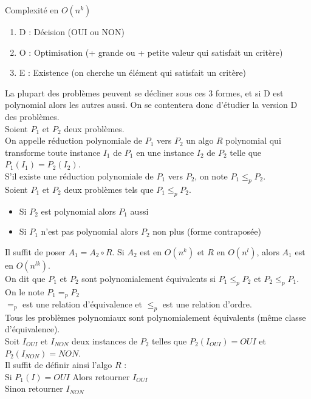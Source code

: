  Complexité en $O(n^k)$

\begin{enumerate}
	\item D : Décision (OUI ou NON)
	\item O : Optimisation (+ grande ou + petite valeur qui satisfait un critère)
	\item E : Existence (on cherche un élément qui satisfait un critère)
\end{enumerate}
La plupart des problèmes peuvent se décliner sous ces 3 formes, et si D est polynomial alors les autres aussi. On se contentera donc d'étudier la version D des problèmes. \\

 Soient $P_1$ et $P_2$ deux problèmes.\\
On appelle réduction polynomiale de $P_1$ vers $P_2$ un algo $R$ polynomial qui transforme toute instance $I_1$ de $P_1$ en une instance $I_2$ de $P_2$ telle que $P_1(I_1) = P_2(I_2)$. \\
S'il existe une réduction polynomiale de $P_1$ vers $P_2$, on note $P_1 \leq_p P_2$. \\

 Soient $P_1$ et $P_2$ deux problèmes tels que $P_1 \leq_p P_2$.
\begin{itemize}
	\item Si $P_2$ est polynomial alors $P_1$ aussi
	\item Si $P_1$ n'est pas polynomial alors $P_2$ non plus (forme contraposée)
\end{itemize}

 Il suffit de poser $A_1 = A_2 \circ R$. Si $A_2$ est en $O(n^k)$ et $R$ en $O(n^l)$, alors $A_1$ est en $O(n^{lk})$. \\

 On dit que $P_1$ et $P_2$ sont polynomialement équivalents si $P_1 \leq_p P_2$ et $P_2 \leq_p P_1$. On le note $P_1 =_p P_2$\\

 $=_p$ est une relation d'équivalence et $\leq_p$ est une relation d'ordre. \\

 Tous les problèmes polynomiaux sont polynomialement équivalents (même classe d'équivalence). \\

 Soit $I_{OUI}$ et $I_{NON}$ deux instances de $P_2$ telles que $P_2(I_{OUI}) = OUI$ et $P_2(I_{NON}) = NON$. \\
Il suffit de définir ainsi l'algo $R$ : \\Si $P_1(I) = OUI$ Alors retourner $I_{OUI}$ \\ Sinon retourner $I_{NON}$

